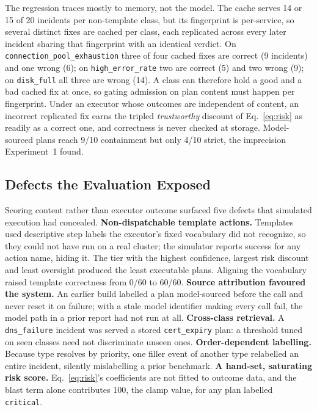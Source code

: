 \documentclass[conference]{IEEEtran}
\begin{document}
\label{sec:amplify}
The regression traces mostly to memory, not the model. The cache serves
14 or 15 of 20 incidents per non-template class, but its fingerprint is
per-service, so several distinct fixes are cached per class, each
replicated across every later incident sharing that fingerprint with an
identical verdict. On \texttt{connection\_pool\_exhaustion} three of four
cached fixes are correct (9 incidents) and one wrong (6); on
\texttt{high\_error\_rate} two are correct (5) and two wrong (9); on
\texttt{disk\_full} all three are wrong (14). A class can therefore hold
a good and a bad cached fix at once, so gating admission on plan content
must happen per fingerprint. Under an executor whose outcomes are
independent of content, an incorrect replicated fix earns the tripled
\emph{trustworthy} discount of Eq.~\eqref{eq:risk} as readily as a
correct one, and correctness is never checked at storage. Model-sourced
plans reach 9/10 containment but only 4/10 strict, the imprecision
Experiment~1 found.

\subsection{Defects the Evaluation Exposed}
\label{sec:defects}
Scoring content rather than executor outcome surfaced five defects that
simulated execution had concealed.
\textbf{Non-dispatchable template actions.} Templates used descriptive
step labels the executor's fixed vocabulary did not recognize, so they
could not have run on a real cluster; the simulator reports success for
any action name, hiding it. The tier with the highest confidence,
largest risk discount and least oversight produced the least executable
plans. Aligning the vocabulary raised template correctness from 0/60 to
60/60. \textbf{Source attribution favoured the system.} An earlier build
labelled a plan model-sourced before the call and never reset it on
failure; with a stale model identifier making every call fail, the model
path in a prior report had not run at all. \textbf{Cross-class
retrieval.} A \texttt{dns\_failure} incident was served a stored
\texttt{cert\_expiry} plan: a threshold tuned on seen classes need not
discriminate unseen ones. \textbf{Order-dependent labelling.} Because
type resolves by priority, one filler event of another type relabelled
an entire incident, silently mislabelling a prior benchmark.
\textbf{A hand-set, saturating risk score.} Eq.~\eqref{eq:risk}'s
coefficients are not fitted to outcome data, and the blast term alone
contributes 100, the clamp value, for any plan labelled
\texttt{critical}.
\end{document}
